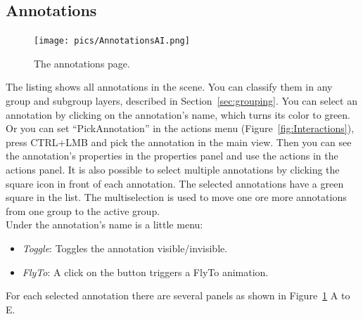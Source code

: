 \newpage
\subsection{Annotations}
\label{sec:annotations}

\begin{figure}[h]
    	\centering
    		\texttt{[image: pics/AnnotationsAI.png]}
    	\caption[Viewer Features Annotations]{The annotations page.}
    	\label{fig:annoProps}
   \end{figure}
	
The listing shows all annotations in the scene. You can classify them in any group and subgroup layers, described in Section~\ref{sec:grouping}.
You can select an annotation by clicking on the annotation's name, which turns its color to green. Or you can set ``PickAnnotation'' in the actions menu (Figure~\ref{fig:Interactions}), press CTRL+LMB and pick the annotation in the main view. Then you can see the annotation's properties in the properties panel and use the actions in the actions panel. 
It is also possible to select multiple annotations by clicking the square icon in front of each annotation. The selected annotations have a green square in the list. The multiselection is used to move one ore more annotations from one group to the active group.\\
Under the annotation's name is a little menu:
\begin{itemize}
  \item \textit{Toggle}: Toggles the annotation visible/invisible.
	\item \textit{FlyTo}: A click on the button triggers a FlyTo animation.
\end{itemize}

For each selected annotation there are several panels as shown in Figure~\ref{fig:annoProps} A to E. 

